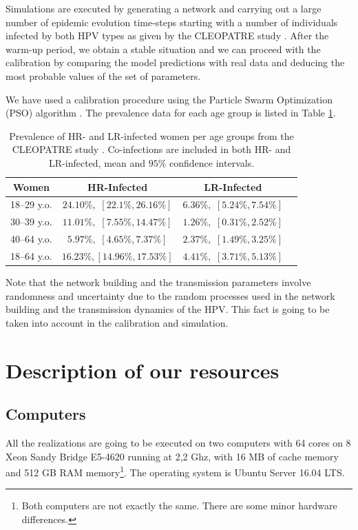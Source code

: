Simulations are executed by generating a network and carrying out a large number of epidemic evolution time-steps starting with a number of individuals infected by both HPV types as given by the CLEOPATRE study \cite{castellsague2012prevalence}.
After the warm-up period, we obtain a stable situation and we can proceed with the calibration by comparing the model predictions with real data and deducing the most probable values of the set of parameters.

We have used a calibration procedure using the Particle Swarm Optimization (PSO) algorithm \cite{khemka2008exploratory}. The prevalence data for each age group is listed in Table \ref{datosConstruccion}.

\begin{table}[H]
	\centering
	\begin{tabular}{cccc}
		\toprule
		\textbf{Women} & \textbf{HR-Infected} & \textbf{LR-Infected} \\
		\midrule
		18--29 y.o. & $24.10\%,$ $[22.1\%, 26.16\%]$ & $6.36\%,$ $[5.24\%, 7.54\%]$ \\
		30--39 y.o. & $11.01\%,$ $[7.55\%, 14.47\%]$ & $1.26\%,$ $[0.31\%, 2.52\%]$ \\
		40--64 y.o. & $5.97\%,$ $[4.65\%, 7.37\%]$ & $2.37\%,$ $[1.49\%, 3.25\%]$ \\
		\midrule
		18--64 y.o. & $16.23\%,$$[14.96\%, 17.53\%]$ & $4.41\%,$ $[3.71\%, 5.13\%]$ \\
		\bottomrule
	\end{tabular}
	\caption{Prevalence of HR- and LR-infected women per age groups from the 
		CLEOPATRE study \protect\cite{castellsague2012prevalence}. Co-infections are included in both HR- and LR-infected, mean and $95\%$ confidence intervals.}
	\label{datosConstruccion}
\end{table}

Note that the network building and the transmission parameters involve randomness and uncertainty due to the random processes used in the network building and the transmission dynamics of the HPV. This fact is going to be taken into account in the  calibration and simulation.

\section{Description of our resources}

\subsection{Computers}
All the realizations are going to be executed on two computers with 64 cores on 8 Xeon Sandy Bridge E5-4620 running at 2,2 Ghz, with 16 MB of cache memory and 512 GB RAM memory\footnote{Both computers are not exactly the same. There are some minor hardware differences.}. The operating system is Ubuntu Server 16.04 LTS. 

